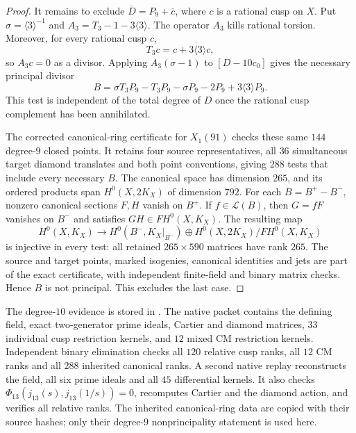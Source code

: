 \begin{proof}
It remains to exclude $\overline D=P_9+\overline c$, where $c$ is a rational cusp on $X$.
Put $\sigma=\langle3\rangle^{-1}$ and $A_3=T_3-1-3\langle3\rangle$.
The operator $A_3$ kills rational torsion. Moreover, for every rational cusp $c$,
\[
 T_3c=c+3\langle3\rangle c,
\]
so $A_3c=0$ as a divisor.
Applying $A_3(\sigma-1)$ to $[D-10c_0]$ gives the necessary principal divisor
\[
 B=\sigma T_3P_9-T_3P_9-\sigma P_9-2P_9+3\langle3\rangle P_9.
\]
This test is independent of the total degree of $D$ once the rational cusp
complement has been annihilated.

The corrected canonical-ring certificate for $X_1(91)$ checks these same
$144$ degree-$9$ closed points. It retains four source representatives,
all $36$ simultaneous target diamond translates and both point conventions,
giving $288$ tests that include every necessary $B$.
The canonical space has dimension $265$, and its ordered products span
$H^0(X,2K_X)$ of dimension $792$.
For each $B=B^+-B^-$, nonzero canonical sections $F,H$ vanish on $B^+$.
If $f\in\mathcal L(B)$, then $G=fF$ vanishes on $B^-$ and satisfies
$GH\in FH^0(X,K_X)$.
The resulting map
\[
 H^0(X,K_X)\longrightarrow
 H^0(B^-,K_X|_{B^-})\oplus
 H^0(X,2K_X)/FH^0(X,K_X)
\]
is injective in every test: all retained $265\times590$ matrices have rank $265$.
The source and target points, marked isogenies, canonical identities and jets
are part of the exact certificate, with independent finite-field and binary
matrix checks. Hence $B$ is not principal. This excludes the last case.
\end{proof}

The degree-$10$ evidence is stored in
.
The native packet contains the defining field, exact two-generator prime ideals,
Cartier and diamond matrices, $33$ individual cusp restriction kernels,
and $12$ mixed CM restriction kernels.
Independent binary elimination checks all $120$ relative cusp ranks,
all $12$ CM ranks and all $288$ inherited canonical ranks.
A second native replay reconstructs the field, all six prime ideals and all
$45$ differential kernels. It also checks
$\Phi_{13}(j_{13}(s),j_{13}(1/s))=0$, recomputes Cartier and the diamond action,
and verifies all relative ranks.
The inherited canonical-ring data are copied with their source hashes;
only their degree-$9$ nonprincipality statement is used here.
